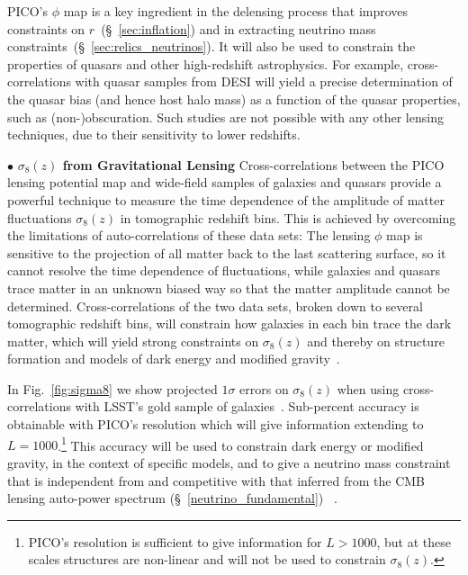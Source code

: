 \documentclass[PICOReport.tex]{subfiles}
\begin{document}
PICO's $\phi$ map is a key ingredient in the delensing process that improves constraints on $r$~(\S~\ref{sec:inflation}) and in extracting neutrino mass constraints~(\S~\ref{sec:relics_neutrinos}). It will also be used to constrain the properties of quasars and other high-redshift astrophysics.  For example, cross-correlations with quasar samples from DESI will yield a precise determination of the quasar bias (and hence host halo mass) as a function of the quasar properties, such as (non-)obscuration.  Such studies are not possible with any other lensing techniques, due to their sensitivity to lower redshifts.


\noindent$\bullet$ {\bf $\sigma_{8}(z)$ from Gravitational Lensing} \hspace{0.1in} \label{sigma8_lensing}
Cross-correlations between the PICO lensing potential map and wide-field samples of galaxies and quasars provide a powerful technique to measure the time dependence of the amplitude of matter fluctuations $\sigma_{8}(z)$ in tomographic redshift bins. This is achieved by overcoming the limitations of auto-correlations of these data sets:
The lensing $\phi$ map is sensitive to the projection of all matter back to the last scattering surface, so it cannot resolve the time dependence of fluctuations, while galaxies and quasars trace matter in an unknown biased way so that the matter amplitude cannot be determined.
Cross-correlations of the two data sets, broken down to several tomographic redshift bins, will constrain how galaxies in each bin trace the dark matter, which will yield strong constraints on $\sigma_8(z)$ and thereby on structure formation and models of dark energy and modified gravity~\citep{2009PhRvL.102b1302S,2018PhRvD..97l3540S}.

In Fig.~\ref{fig:sigma8} we show projected $1\sigma$ errors on $\sigma_8(z)$ when using cross-correlations with LSST's gold sample of galaxies~\citep{LSSTSciBook}.  Sub-percent accuracy is obtainable with PICO's resolution which will give information extending to $L =1000$.\footnote{PICO's resolution is sufficient to give information for $L>1000$, but at these scales structures are non-linear and will not be used to constrain $\sigma_{8}(z)$.} This accuracy will be used to constrain dark energy or modified gravity, in the context of specific models, and to give a neutrino mass constraint that is independent from and competitive with that inferred from the CMB lensing auto-power spectrum (\S~\ref{neutrino_fundamental})~\citep{2018arXiv180902120Y} .
\end{document}
